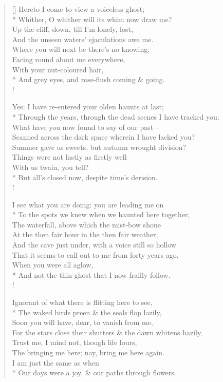 \documentclass[MAIN]{subfiles}
\begin{document}
\settowidth{\versewidth}{\vin Whither, O whither will its whim now draw me?}
\begin{verse}[\versewidth]
Hereto I come to view a voiceless ghost;\\*
\vin Whither, O whither will its whim now draw me?\\
Up the cliff, down, till I'm lonely, lost,\\
\vin And the unseen waters' ejaculations awe me.\\
Where you will next be there's no knowing,\\
\vin Facing round about me everywhere,\\
\vin \vin With your nut-coloured hair,\\*
And grey eyes, and rose-flush coming \& going.\\!

Yes: I have re-entered your olden haunts at last;\\*
\vin Through the years, through the dead scenes I have tracked you;\\
What have you now found to say of our past --\\
\vin Scanned across the dark space wherein I have lacked you?\\
Summer gave us sweets, but autumn wrought division?\\
\vin Things were not lastly as firstly well\\
\vin \vin With us twain, you tell?\\*
But all's closed now, despite time's derision.\\!

I see what you are doing: you are leading me on\\*
\vin To the spots we knew when we haunted here together,\\
The waterfall, above which the mist-bow shone\\
\vin At the then fair hour in the then fair weather,\\
And the cave just under, with a voice still so hollow\\
\vin That it seems to call out to me from forty years ago,\\
\vin \vin When you were all aglow,\\*
And not the thin ghost that I now frailly follow.\\!

Ignorant of what there is flitting here to see,\\*
\vin The waked birds preen \& the seals flop lazily,\\
Soon you will have, dear, to vanish from me,\\
\vin For the stars close their shutters \& the dawn whitens hazily.\\
Trust me, I mind not, though life lours,\\
\vin The bringing me here; nay, bring me here again.\\
\vin \vin I am just the same as when\\*
Our days were a joy, \& our paths through flowers.
\end{verse}
\end{document}
